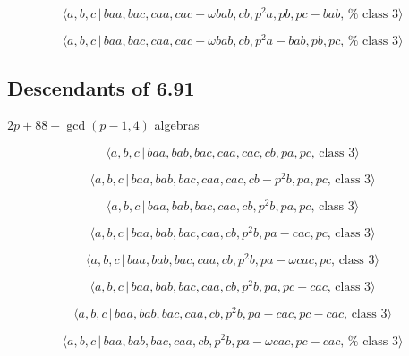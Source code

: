 \documentclass[10pt]{article}
\begin{document}
\begin{equation}
\langle a,b,c\,|\,baa,bac,caa,cac+\omega bab,cb,p^{2}a,pb,pc-bab,\,\text{%
class }3\rangle  \tag{7.2696}
\end{equation}

\begin{equation}
\langle a,b,c\,|\,baa,bac,caa,cac+\omega bab,cb,p^{2}a-bab,pb,pc,\,\text{%
class }3\rangle  \tag{7.2697}
\end{equation}

\subsection{Descendants of 6.91}

$2p+88+\gcd (p-1,4)$ algebras

\begin{equation}
\langle a,b,c\,|\,baa,bab,bac,caa,cac,cb,pa,pc,\,\text{class }3\rangle 
\tag{7.2698}
\end{equation}

\begin{equation}
\langle a,b,c\,|\,baa,bab,bac,caa,cac,cb-p^2b,pa,pc,\,\text{class }3\rangle 
\tag{7.2699}
\end{equation}

\begin{equation}
\langle a,b,c\,|\,baa,bab,bac,caa,cb,p^2b,pa,pc,\,\text{class }3\rangle 
\tag{7.2700}
\end{equation}

\begin{equation}
\langle a,b,c\,|\,baa,bab,bac,caa,cb,p^2b,pa-cac,pc,\,\text{class }3\rangle 
\tag{7.2701}
\end{equation}

\begin{equation}
\langle a,b,c\,|\,baa,bab,bac,caa,cb,p^{2}b,pa-\omega cac,pc,\,\text{class }%
3\rangle  \tag{7.2702}
\end{equation}

\begin{equation}
\langle a,b,c\,|\,baa,bab,bac,caa,cb,p^2b,pa,pc-cac,\,\text{class }3\rangle 
\tag{7.2703}
\end{equation}

\begin{equation}
\langle a,b,c\,|\,baa,bab,bac,caa,cb,p^2b,pa-cac,pc-cac,\,\text{class }%
3\rangle  \tag{7.2704}
\end{equation}

\begin{equation}
\langle a,b,c\,|\,baa,bab,bac,caa,cb,p^{2}b,pa-\omega cac,pc-cac,\,\text{%
class }3\rangle  \tag{7.2705}
\end{equation}
\end{document}
